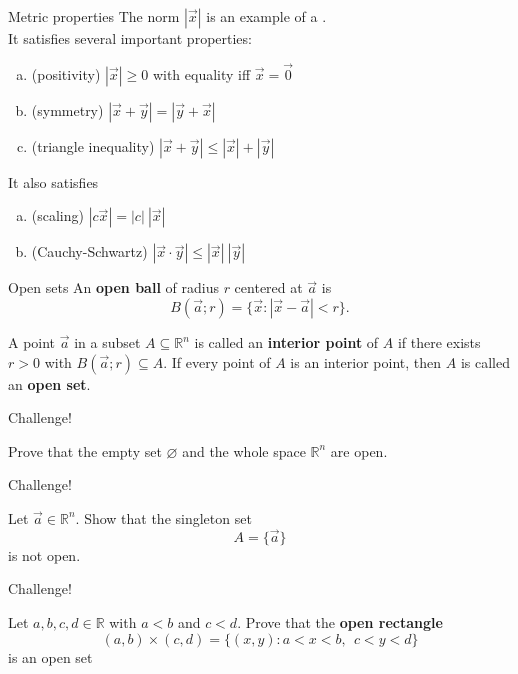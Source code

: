\documentclass{beamer}
\begin{document}
\begin{frame}{Metric properties}
\pause
The norm $|\vec x|$ is an example of a .\\
\pause
It satisfies several important properties:
\pause
\begin{thm}
\begin{enumerate}[(a)]
\pause
\item (positivity) $|\vec x| \geq 0$ with equality iff $\vec x = \vec 0$
\pause
\item (symmetry) $|\vec x + \vec y| = |\vec y + \vec x|$
\pause
\item (triangle inequality) $|\vec x + \vec y| \leq |\vec x| + | \vec y|$
\end{enumerate}
\end{thm}
\pause
It also satisfies 
\pause
\begin{enumerate}[(a)]
\pause
\item (scaling)  $|c\vec x| = |c|\ |\vec x|$
\pause
\item (Cauchy-Schwartz) $|\vec x\cdot\vec y|\leq |\vec x|\ |\vec y|$
\end{enumerate}
\end{frame}

\begin{frame}{Open sets}
An \textbf{open ball} of radius $r$ centered at $\vec a$ is
\pause
$$B(\vec a;r)  = \{\vec x: |\vec x-\vec a| < r\}.$$
\pause
\begin{defn}
\pause
A point $\vec a$ in a subset $A\subseteq\mathbb{R}^n$ is called an \textbf{interior point} of $A$ if there exists $r>0$ with
$B(\vec a; r)\subseteq A$.
\pause
If every point of $A$ is an interior point, then $A$ is called an \textbf{open set}.
\end{defn}
\end{frame}

\begin{frame}{Challenge!}
\begin{prob}
Prove that the empty set $\varnothing$ and the whole space $\mathbb{R}^n$ are open.
\end{prob}
\end{frame}

\begin{frame}{Challenge!}
\begin{prob}
Let $\vec a\in\mathbb{R}^n$.
Show that the singleton set
$$A = \{\vec a\}$$
is not open.
\end{prob}
\end{frame}


\begin{frame}{Challenge!}
\begin{prob}
Let $a,b,c,d\in\mathbb{R}$ with $a < b$ and $c < d$.
Prove that the \textbf{open rectangle}
$$(a,b)\times (c,d) = \{(x,y): a < x < b,\ \ c < y < d\}$$
is an open set
\end{prob}
\end{frame}
\end{document}
